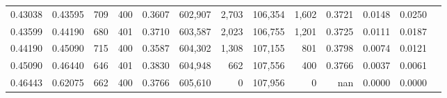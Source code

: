 \begin{tabular}{rrrrrrrrrrrrr}
0.43038 & 0.43595 &    709 & 400 &                                     0.3607 & 602,907 &   2,703 & 106,354 &   1,602 & 0.3721 & 0.0148 & 0.0250 \\
0.43599 & 0.44190 &    680 & 401 &                                     0.3710 & 603,587 &   2,023 & 106,755 &   1,201 & 0.3725 & 0.0111 & 0.0187 \\
0.44190 & 0.45090 &    715 & 400 &                                     0.3587 & 604,302 &   1,308 & 107,155 &     801 & 0.3798 & 0.0074 & 0.0121 \\
0.45090 & 0.46440 &    646 & 401 &                                     0.3830 & 604,948 &     662 & 107,556 &     400 & 0.3766 & 0.0037 & 0.0061 \\
0.46443 & 0.62075 &    662 & 400 &                                     0.3766 & 605,610 &       0 & 107,956 &       0 &    nan & 0.0000 & 0.0000 \\
\bottomrule
\end{tabular}
